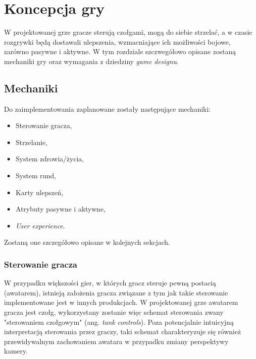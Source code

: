 \chapter{Koncepcja gry}\label{ch:concept}
\cite{game_engine_architecture}
W projektowanej grze gracze sterują czołgami, mogą do siebie strzelać, a w czasie rozgrywki będą dostawali ulepszenia, wzmacniające ich możliwości bojowe, zarówno pasywne i aktywne.
W tym rozdziale szczwegółowo opisane zostaną mechaniki gry oraz wymagania z dziedziny \emph{game designu}.

\section{Mechaniki}\label{sec:mechanics_concept}

Do zaimplementowania zaplanowane zostały następujące mechaniki:

\begin{itemize}
    \item Sterowanie gracza,
    \item Strzelanie,
    \item System zdrowia/życia,
    \item System rund,
    \item Karty ulepszeń,
    \item Atrybuty pasywne i aktywne,
    \item \emph{User experience}.
\end{itemize}

Zostaną one szczegółowo opisane w kolejnych sekcjach.



\subsection{Sterowanie gracza}\label{sec:steering_concept}

W przypadku większości gier, w których gracz steruje pewną postacią (awatarem), istnieją założenia gracza związane z tym jak takie sterowanie implementowane jest w innych produkcjach.
W projektowanej grze awatarem gracza jest czołg, wykorzystany zostanie więc schemat sterowania zwany "sterowaniem czołgowym" (ang. \emph{tank controls}). \cite{horror_tank_controls}
Poza potencjalnie intuicyjną interpretacją sterowania przez graczy, taki schemat charakteryzuje się również przewidywalnym zachowaniem awatara w przypadku zmiany perspektywy kamery.

